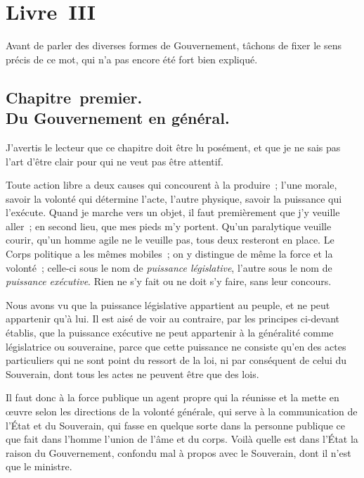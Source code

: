 \documentclass[french,twoside]{book} %
\begin{document}
\section[{Livre III}]{Livre III}\renewcommand{\leftmark}{Livre III}

\noindent Avant de parler des diverses formes de Gouvernement, tâchons de fixer le sens précis de ce mot, qui n’a pas encore été fort bien expliqué.\par
\subsection[{Chapitre premier. Du Gouvernement en général.}]{Chapitre premier. \\
Du Gouvernement en général.}
\noindent J’avertis le lecteur que ce chapitre doit être lu posément, et que je ne sais pas l’art d’être clair pour qui ne veut pas être attentif.\par
Toute action libre a deux causes qui concourent à la produire ; l’une morale, savoir la volonté qui détermine l’acte, l’autre physique, savoir la puissance qui l’exécute. Quand je marche vers un objet, il faut premièrement que j’y veuille aller ; en second lieu, que mes pieds m’y portent. Qu’un paralytique veuille courir, qu’un homme agile ne le veuille pas, tous deux resteront en place. Le Corps politique a les mêmes mobiles ; on y distingue de même la force et la volonté ; celle-ci sous le nom de {\itshape puissance législative}, l’autre sous le nom de {\itshape puissance exécutive}. Rien ne s’y fait ou ne doit s’y faire, sans leur concours.\par
Nous avons vu que la puissance législative appartient au peuple, et ne peut appartenir qu’à lui. Il est aisé de voir au contraire, par les principes ci-devant établis, que la puissance exécutive ne peut appartenir à la généralité comme législatrice ou souveraine, parce que cette puissance ne consiste qu’en des actes particuliers qui ne sont point du ressort de la loi, ni par conséquent de celui du Souverain, dont tous les actes ne peuvent être que des lois.\par
Il faut donc à la force publique un agent propre qui la réunisse et la mette en œuvre selon les directions de la volonté générale, qui serve à la communication de l’État et du Souverain, qui fasse en quelque sorte dans la personne publique ce que fait dans l’homme l’union de l’âme et du corps. Voilà quelle est dans l’État la raison du Gouvernement, confondu mal à propos avec le Souverain, dont il n’est que le ministre.\par
\end{document}
